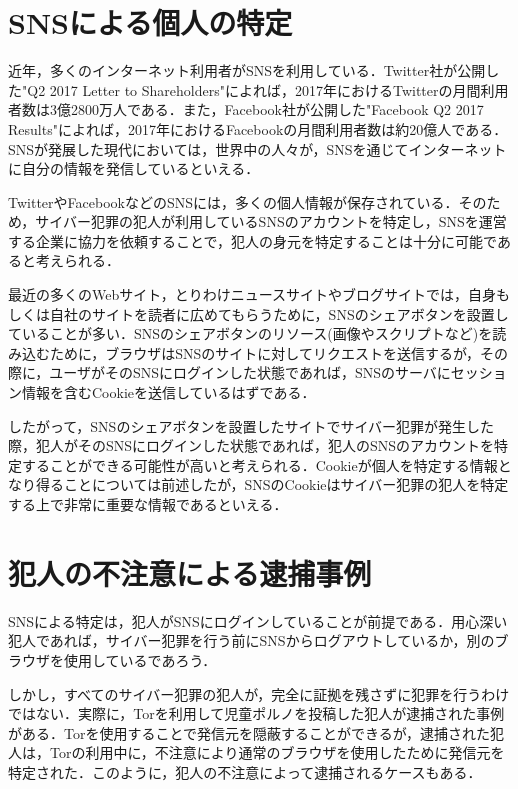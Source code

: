 \documentclass[10pt, a4paper]{jreport}
\begin{document}
\section{SNSによる個人の特定}
近年，多くのインターネット利用者がSNSを利用している\cite{many_people_use_sns}．Twitter社が公開した"Q2 2017 Letter to Shareholders"によれば，2017年におけるTwitterの月間利用者数は3億2800万人である\cite{many_people_use_twitter}．また，Facebook社が公開した"Facebook Q2 2017 Results"によれば，2017年におけるFacebookの月間利用者数は約20億人である\cite{many_people_use_facebook}．SNSが発展した現代においては，世界中の人々が，SNSを通じてインターネットに自分の情報を発信しているといえる．

TwitterやFacebookなどのSNSには，多くの個人情報が保存されている．そのため，サイバー犯罪の犯人が利用しているSNSのアカウントを特定し，SNSを運営する企業に協力を依頼することで，犯人の身元を特定することは十分に可能であると考えられる．

最近の多くのWebサイト，とりわけニュースサイトやブログサイトでは，自身もしくは自社のサイトを読者に広めてもらうために，SNSのシェアボタンを設置していることが多い．SNSのシェアボタンのリソース(画像やスクリプトなど)を読み込むために，ブラウザはSNSのサイトに対してリクエストを送信するが，その際に，ユーザがそのSNSにログインした状態であれば，SNSのサーバにセッション情報を含むCookieを送信しているはずである．

したがって，SNSのシェアボタンを設置したサイトでサイバー犯罪が発生した際，犯人がそのSNSにログインした状態であれば，犯人のSNSのアカウントを特定することができる可能性が高いと考えられる．Cookieが個人を特定する情報となり得ることについては前述したが，SNSのCookieはサイバー犯罪の犯人を特定する上で非常に重要な情報であるといえる．

\section{犯人の不注意による逮捕事例}
SNSによる特定は，犯人がSNSにログインしていることが前提である．用心深い犯人であれば，サイバー犯罪を行う前にSNSからログアウトしているか，別のブラウザを使用しているであろう．

しかし，すべてのサイバー犯罪の犯人が，完全に証拠を残さずに犯罪を行うわけではない．実際に，Torを利用して児童ポルノを投稿した犯人が逮捕された事例がある．Torを使用することで発信元を隠蔽することができるが，逮捕された犯人は，Torの利用中に，不注意により通常のブラウザを使用したために発信元を特定された．このように，犯人の不注意によって逮捕されるケースもある．
\end{document}
